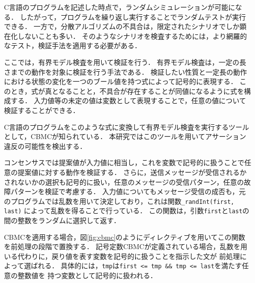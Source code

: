\documentclass[technicalreport]{ieicej}
\theoremstyle{plain}
\begin{document}
C言語のプログラムを記述した時点で，ランダムシミュレーションが可能になる．
したがって，プログラムを繰り返し実行することでランダムテストが実行できる．
一方で，分散アルゴリズムの不具合は，限定されたシナリオでしか顕在化しないことも多い．
そのようなシナリオを検査するためには，より網羅的なテスト，検証手法を適用する必要がある．

ここでは，有界モデル検査を用いて検証を行う．
有界モデル検査は，一定の長さまでの動作を対象に検証を行う手法である．
検証したい性質と一定長の動作における状態の変化を一つのブール値を持つ式によって記号的に表現する．
このとき，式が真となることと，不具合が存在することが同値になるように式を構成する．
入力値等の未定の値は変数として表現することで，任意の値について検証することができる．

C言語のプログラムをこのような式に変換して有界モデル検査を実行するツールとして，CBMCが知られている\cite{ckl2004}．
本研究ではこのツールを用いてアサーション違反の可能性を検出する．


コンセンサスでは提案値が入力値に相当し，これを変数で記号的に扱うことで任意の提案値に対する動作を検証する．
さらに，送信メッセージが受信されるかされないかの選択も記号的に扱い，任意のメッセージの受信パターン，任意の故障パターンを検証で考慮する．
入力値についてもメッセージ受信の成否も，元のプログラムでは乱数を用いて決定しており，これは関数\verb|_randInt(first, last)|
によって乱数を得ることで行っている．
この関数は，引数\verb|first|と\verb|last|の間の整数をランダムに選択して返す．

CBMCを適用する場合，図\ref{fig:cbmc}のようにディレクティブを用いてこの関数を前処理の段階で置換する．
記号定数CBMCが定義されている場合，乱数を用いる代わりに，戻り値を表す変数を記号的に扱うことを指示した文が
前処理によって選ばれる．
具体的には，\verb|tmp|は\verb|first <= tmp && tmp <= last|を満たす任意の整数値を
持つ変数として記号的に扱われる．


%
\end{document}
